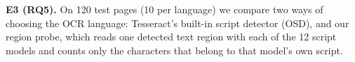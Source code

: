 \textbf{E3 (RQ5).} On 120 test pages (10 per language) we compare two ways of choosing the OCR language:
Tesseract's built-in script detector (OSD), and our region probe, which reads one detected text region with
each of the 12 script models and counts only the characters that belong to that model's own script.
